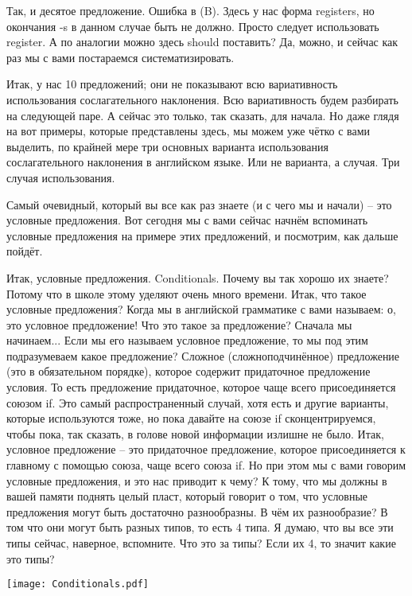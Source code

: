 \documentclass[main.tex]{subfiles}
\begin{document}
Так, и десятое предложение.
Ошибка в (B).
Здесь у нас форма registers, но окончания -s в данном случае быть не должно.
Просто следует использовать register.
А по аналогии можно здесь should поставить?
Да, можно, и сейчас как раз мы с вами постараемся систематизировать.

Итак, у нас 10 предложений; они не показывают всю вариативность использования сослагательного наклонения.
Всю вариативность будем разбирать на следующей паре.
А сейчас это только, так сказать, для начала.
Но даже глядя на вот примеры, которые представлены здесь, мы можем уже чётко с вами выделить, по крайней мере три основных варианта использования сослагательного наклонения в английском языке.
Или не варианта, а случая.
Три случая использования.

Самый очевидный, который вы все как раз знаете (и с чего мы и начали) -- это условные предложения.
Вот сегодня мы с вами сейчас начнём вспоминать условные предложения на примере этих предложений, и посмотрим, как дальше пойдёт.

\newpage
{}

Итак, условные предложения.
Conditionals.
Почему вы так хорошо их знаете?
Потому что в школе этому уделяют очень много времени.
Итак, что такое условные предложения?
Когда мы в английской грамматике с вами называем: о, это условное предложение!
Что это такое за предложение?
Сначала мы начинаем...
Если мы его называем условное предложение, то мы под этим подразумеваем какое предложение?
Сложное (сложноподчинённое) предложение (это в обязательном порядке), которое содержит придаточное предложение условия.
То есть предложение придаточное, которое чаще всего присоединяется союзом if.
Это самый распространенный случай, хотя есть и другие варианты, которые используются тоже, но пока давайте на союзе if сконцентрируемся, чтобы пока, так сказать, в голове новой информации излишне не было.
Итак, условное предложение -- это придаточное предложение, которое присоединяется к главному с помощью союза, чаще всего союза if.
Но при этом мы с вами говорим условные предложения, и это нас приводит к чему?
К тому, что мы должны в вашей памяти поднять целый пласт, который говорит о том, что условные предложения могут быть достаточно разнообразны.
В чём их разнообразие?
В том что они могут быть разных типов, то есть 4 типа.
Я думаю, что вы все эти типы сейчас, наверное, вспомните.
Что это за типы?
Если их 4, то значит какие это типы?

{\parindent0pt\texttt{[image: Conditionals.pdf]}}
\end{document}

